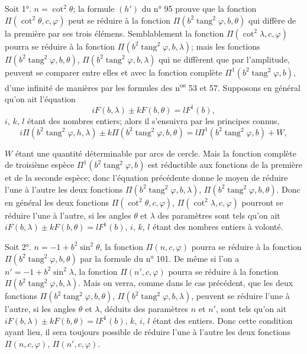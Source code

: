 \documentclass{article}
\begin{document}
Soit 1°. $n=\cot^{2}\theta$; la formule $(h')$ du n° 95 prouve que la fonction $\Pi(\cot^{2}\theta,c,\varphi)$ peut se réduire à la fonction $\Pi(b^{2}\operatorname{tang}^{2}\varphi,b,\theta)$ qui diffère de la première par ses trois élémens. Semblablement la fonction $\Pi(\cot^{2}\lambda,c,\varphi)$ pourra se réduire à la fonction $\Pi(b^{2}\operatorname{tang}^{2}\varphi,b,\lambda)$; mais les fonctions $\Pi(b^{2}\operatorname{tang}^{2}\varphi,b,\theta)$, $\Pi(b^{2}\operatorname{tang}^{2}\varphi,b,\lambda)$ qui ne diffèrent que par l'amplitude, peuvent se comparer entre elles et avec la fonction complète $\Pi^{1}(b^{2}\operatorname{tang}^{2}\varphi,b)$, d'une infinité de manières par les formules des n\textsuperscript{os} 53 et 57. Supposons en général qu'on ait l'équation
\[ iF(b,\lambda)\pm kF(b,\theta)=lF^{1}(b), \]
$i$, $k$, $l$ étant des nombres entiers; alors il s'ensuivra par les principes connus,
\[ i\Pi(b^{2}\operatorname{tang}^{2}\varphi,h,\lambda)\pm k\Pi(b^{2}\operatorname{tang}^{2}\varphi,b,\theta)=l\Pi^{1}(b^{2}\operatorname{tang}^{2}\varphi,b)+W, \]

$W$ étant une quantité déterminable par arcs de cercle. Mais la fonction complète de troisième espèce $\Pi^{1}(b^{2}\operatorname{tang}^{2}\varphi,b)$ est réductible aux fonctions de la première et de la seconde espèce; donc l'équation précédente donne le moyen de réduire l'une à l'autre les deux fonctions $\Pi(b^{2}\operatorname{tang}^{2}\varphi,b,\lambda)$, $\Pi(b^{2}\operatorname{tang}^{2}\varphi,b,\theta)$. Donc en général les deux fonctions $\Pi(\cot^{2}\theta,c,\varphi)$, $\Pi(\cot^{2}\lambda,c,\varphi)$ pourront se réduire l'une à l'autre, si les angles $\theta$ et $\lambda$ des paramètres sont tels qu'on ait $iF(b,\lambda)\pm kF(b,\theta)=lF^{1}(b)$, $i$, $k$, $l$ étant des nombres entiers à volonté.

Soit 2°. $n=-1+b^{2}\sin^{2}\theta$, la fonction $\Pi(n,c,\varphi)$ pourra se réduire à la fonction $\Pi(b^{2}\operatorname{tang}^{2}\varphi,b,\theta)$ par la formule du n° 101. De même si l'on a $n'=-1+b^{2}\sin^{2}\lambda$, la fonction $\Pi(n',c,\varphi)$ pourra se réduire à la fonction $\Pi(b^{2}\operatorname{tang}^{2}\varphi,b,\lambda)$. Mais on verra, comme dans le cas précédent, que les deux fonctions $\Pi(b^{2}\operatorname{tang}^{2}\varphi,b,\theta)$, $\Pi(b^{2}\operatorname{tang}^{2}\varphi,b,\lambda)$, peuvent se réduire l'une à l'autre, si les angles $\theta$ et $\lambda$, déduits des paramètres $n$ et $n'$, sont tels qu'on ait $iF(b,\lambda)\pm kF(b,\theta)=lF^{1}(b)$, $k$, $i$, $l$ étant des entiers. Donc cette condition ayant lieu, il sera toujours possible de réduire l'une à l'autre les deux fonctions $\Pi(n,c,\varphi)$, $\Pi(n',c,\varphi)$.
\end{document}
